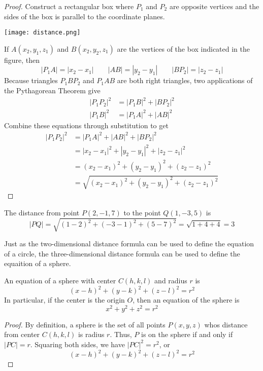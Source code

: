   \begin{proof}\let\qed\relax
    Construct a rectangular box where $P_1$ and $P_2$ are opposite vertices and the sides of the box is parallel to the coordinate planes.
    \begin{center}
      \texttt{[image: distance.png]}
    \end{center}
    If $A(x_2,y_1,z_1)$ and $B(x_2,y_2,z_1)$ are the vertices of the box indicated in the figure, then
    $$|P_1 A| = |x_2 - x_1| \qquad |AB| = |y_2 - y_1| \qquad |BP_2| = |z_2 - z_1|$$
    Because triangles $P_1 BP_2$ and $P_1 AB$ are both right triangles, two applications of the Pythagorean Theorem give
    \begin{align*}
      |P_1 P_2|^2 &= |P_1 B|^2 + |BP_2|^2 \\
      |P_1 B|^2 &= |P_1 A|^2 + |AB|^2
    \end{align*}
    Combine these equations through substitution to get
    \begin{align*}
      |P_1 P_2|^2 &= |P_1 A|^2 + |AB|^2 + |BP_2|^2 \\
      &= |x_2 - x_1|^2 + |y_2 - y_1|^2 + |z_2 - z_1|^2 \\
      &= (x_2 - x_1)^2 + (y_2 - y_1)^2 + (z_2 - z_1)^2 \\
      &= \sqrt{(x_2 - x_1)^2 + (y_2 - y_1)^2 + (z_2 - z_1)^2}
    \end{align*}
  \end{proof}
  \begin{example}
    The distance from point $P(2,-1,7)$ to the point $Q(1,-3,5)$ is
    $$ |PQ| = \sqrt{(1 - 2)^2 + (-3 - 1)^2 + (5 - 7)^2} = \sqrt{1+4+4} = 3$$
  \end{example}
  Just as the two-dimensional distance formula can be used to define the equation of a circle, the three-dimensional distance formula can be used to define the equaition of a sphere.
  \begin{definition}
    An equation of a sphere with center $C(h,k,l)$ and radius $r$ is
    $$(x-h)^2 + (y-k)^2 + (z-l)^2 = r^2$$
    In particular, if the center is the origin $O$, then an equation of the sphere is
    $$x^2 + y^2 + z^2 = r^2$$
  \end{definition}
  \begin{proof}\let\qed\relax
    By definition, a sphere is the set of all points $P(x,y,z)$ whos distance from center $C(h,k,l)$ is radius $r$. Thus, $P$ is on the sphere if and only if $|PC|=r$. Squaring both sides, we have $|PC|^2=r^2$, or
    $$(x-h)^2 + (y-k)^2 + (z-l)^2 = r^2$$
  \end{proof}

